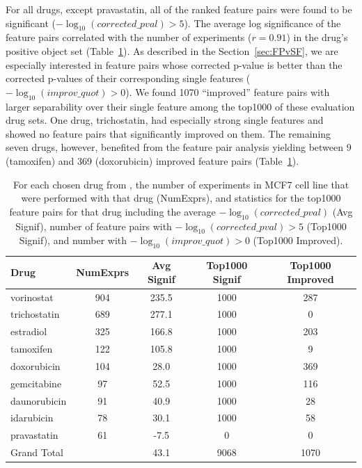 For all drugs, except pravastatin, all of the \topthousand ranked feature pairs were found to be significant ($-\log_{10} (corrected\_pval) > 5$). The average log significance of the \topthousand feature pairs correlated with the number of experiments ($r=0.91$) in the drug's positive object set (Table~\ref{tbl:selected_fps}). As described in the Section~\ref{sec:FPvSF}, we are especially interested in feature pairs whose corrected p-value is better than the corrected p-values of their corresponding single features ($-\log_{10} (improv\_quot) > 0$). We found 1070 ``improved'' feature pairs with larger separability over their single feature among the top1000 of these evaluation drug sets. One drug, trichostatin, had especially strong single features and showed no feature pairs that significantly improved on them. The remaining seven drugs, however, benefited from the feature pair analysis yielding between 9 (tamoxifen) and 369 (doxorubicin) improved feature pairs (Table~\ref{tbl:selected_fps}).


\begin{table}[t!]
\centering
\small
\begin{tabular}{|l|c|c|c|c|}
\hline
 Drug & NumExprs & Avg Signif & Top1000 Signif & Top1000 Improved\\
\hline
vorinostat & 904 & 235.5 & 1000 & 287\\
\hline
trichostatin & 689 & 277.1 & 1000 & 0\\
\hline
estradiol & 325 & 166.8 & 1000 & 203\\
\hline
tamoxifen & 122 & 105.8 & 1000 & 9\\
\hline
doxorubicin & 104 & 28.0 & 1000 & 369\\
\hline
gemcitabine & 97 & 52.5 & 1000 & 116\\
\hline
daunorubicin & 91 & 40.9 & 1000 & 28\\
\hline
idarubicin & 78 & 30.1 & 1000 & 58\\
\hline
pravastatin & 61 & -7.5 & 0 & 0\\
\hline
Grand Total & & 43.1 & 9068 & 1070\\
\hline
 \end{tabular}
\caption{\scriptsize   For each chosen drug from \lincs, the number of experiments in MCF7 cell line that were performed with that drug (NumExprs), and statistics for the top1000 feature pairs for that drug including the average $-\log_{10} (corrected\_pval)$ (Avg Signif), number of feature pairs with $-\log_{10} (corrected\_pval) > 5$ (Top1000 Signif), and number with $-\log_{10} (improv\_quot) > 0$ (Top1000 Improved).}
\label{tbl:selected_fps}
\vspace{-18pt}
\end{table}


